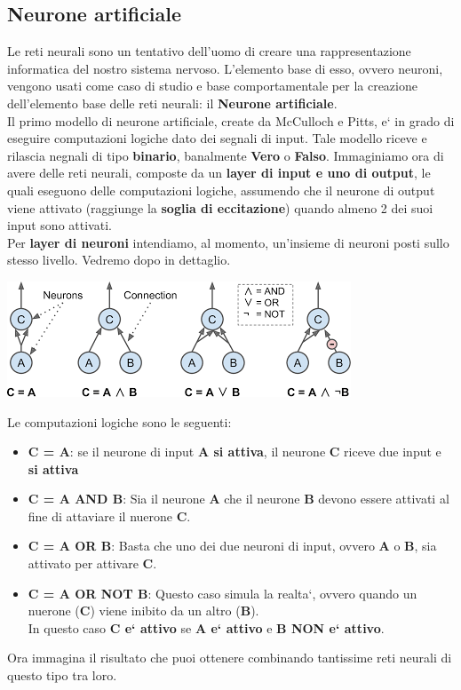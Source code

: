 \subsection{Neurone artificiale}
Le reti neurali sono un tentativo dell'uomo di creare una rappresentazione 
%
informatica del nostro sistema nervoso.
L'elemento base di esso, ovvero neuroni, vengono usati come caso di studio e base
%
comportamentale per la creazione dell'elemento base delle reti neurali: il 
\textbf{Neurone artificiale}.
\\
Il primo modello di neurone artificiale, create da McCulloch e Pitts, e` in grado 
%
di eseguire computazioni logiche dato dei segnali di input.
%
Tale modello riceve e rilascia negnali di tipo \textbf{binario}, banalmente 
%
\textbf{Vero} o \textbf{Falso}.
%
Immaginiamo ora di avere delle reti neurali, composte da un 
%
\textbf{layer di input e uno di output}, le quali eseguono delle 
%
computazioni  logiche, assumendo che il neurone di output viene attivato (raggiunge la
%
\textbf{soglia di eccitazione}) quando almeno 2 dei suoi input sono attivati.
\\
Per \textbf{layer di neuroni} intendiamo, al momento, un'insieme di neuroni 
%
posti sullo stesso livello. Vedremo dopo in dettaglio.
%
\begin{center}
    \includegraphics[scale=0.7]{images/Logical_Computation_With_Neurons.png}
\end{center}
%
Le computazioni logiche sono le seguenti:
\begin{itemize}
    \item \textbf{C = A}: se il neurone di input \textbf{A si attiva}, il neurone 
%
    \textbf{C} riceve due input e \textbf{si attiva}
    \item \textbf{C = A AND B}: Sia il neurone \textbf{A} che il neurone 
%    
    \textbf{B} devono essere attivati al fine di attaviare il nuerone \textbf{C}.
    \item \textbf{C = A OR B}: Basta che uno dei due neuroni di input, ovvero  
%
    \textbf{A} o \textbf{B}, sia attivato per attivare \textbf{C}.
    \item \textbf{C = A OR NOT B}: Questo caso simula la realta`, ovvero quando 
%
    un nuerone (\textbf{C}) viene inibito da un altro (\textbf{B}).
\\
    In questo caso \textbf{C e` attivo} se \textbf{A e` attivo} e 
%
    \textbf{B NON e` attivo}.
\end{itemize}
Ora immagina il risultato che puoi ottenere combinando tantissime reti neurali 
%
di questo tipo tra loro.
\newpage
